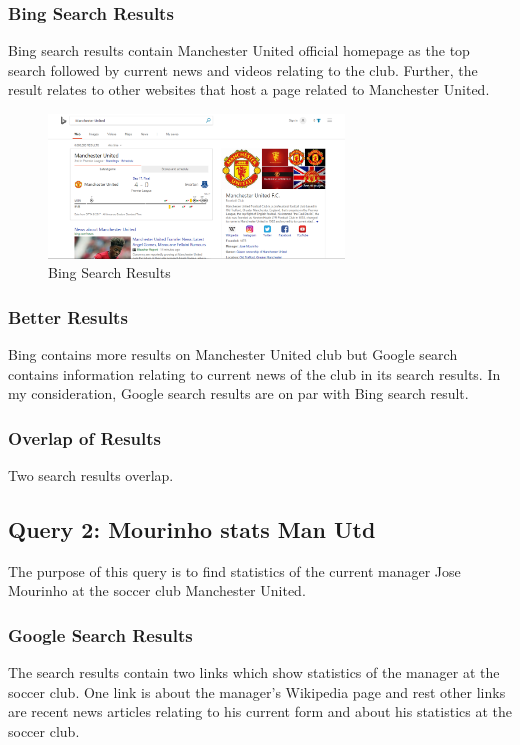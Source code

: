 \documentclass[12pt]{report}
\begin{document}
\subsubsection{Bing Search Results}
Bing search results contain Manchester United official homepage as the top search followed by current news and videos relating to the club. Further, the result relates to other websites that host a page related to Manchester United. 

\begin{figure}[ht]
  \centering
  \includegraphics[width=0.7\textwidth]{Query1_Bing.PNG}
  \caption{Bing Search Results}
  \label{fig:2}
\end{figure}

\subsubsection{Better Results}
Bing contains more results on Manchester United club but Google search contains information relating to current news of the club in its search results. In my consideration, Google search results are on par with Bing search result.
\subsubsection{Overlap of Results}
Two search results overlap.

\subsection{Query 2: Mourinho stats Man Utd}
The purpose of this query is to find statistics of the current manager Jose Mourinho at the soccer club Manchester United.
\subsubsection{Google Search Results}
The search results contain two links which show statistics of the manager at the soccer club. One link is about the manager's Wikipedia page and rest other links are recent news articles relating to his current form and about his statistics at the soccer club.
\end{document}
